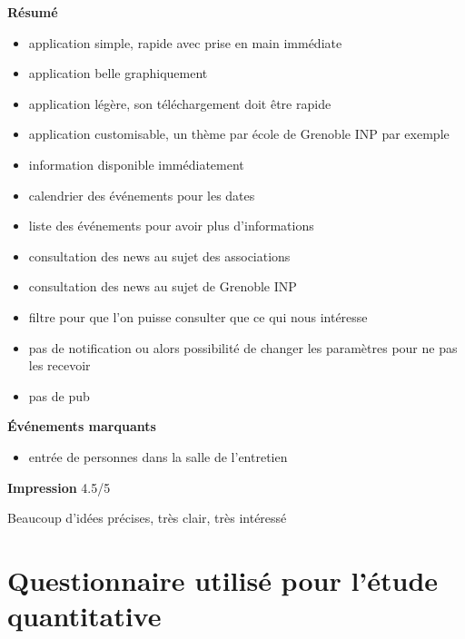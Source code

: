 \documentclass[a4paper, 11px]{article}
\begin{document}
\textbf{Résumé}
	\begin{itemize}
		\item application simple, rapide avec prise en main immédiate
		\item application belle graphiquement
		\item application légère, son téléchargement doit être rapide
		\item application customisable, un thème par école de Grenoble INP par exemple
		\item information disponible immédiatement
		\item calendrier des événements pour les dates
		\item liste des événements pour avoir plus d'informations
		\item consultation des news au sujet des associations
		\item consultation des news au sujet de Grenoble INP
		\item filtre pour que l'on puisse consulter que ce qui nous intéresse
		\item pas de notification ou alors possibilité de changer les paramètres pour ne pas les recevoir
		\item pas de pub
	\end{itemize}

\vspace{.25cm}
\textbf{Événements marquants}
	\begin{itemize}
		\item entrée de personnes dans la salle de l'entretien
	\end{itemize}

\vspace{.25cm}
\textbf{Impression} 4.5/5 

Beaucoup d'idées précises, très clair, très intéressé

\newpage

\section{Questionnaire utilisé pour l'étude quantitative}
\end{document}
